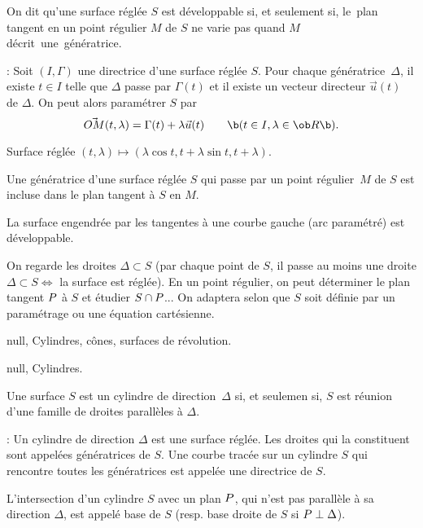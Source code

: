 \Definition [] On dit qu'une surface r\'egl\'ee $S$ est d\'eveloppable si, et seulement si, 
le~plan tangent en un point r\'egulier $M$ de $S$ ne varie pas quand $M$ 
d\'ecrit~une~g\'en\'eratrice. 
\bigskip

\Remarque : Soit $(I,\Gamma)$ une directrice d'une surface r\'egl\'ee $S$. 
Pour chaque g\'en\'eratrice~$\Delta$, il existe $t\in I$ telle que $\Delta$ 
passe par $\Gamma(t)$ et il existe un vecteur directeur $\vec u(t)$ de $\Delta$. 
On peut alors param\'etrer $S$ par 
$$
\vec{OM}(t,\lambda)=\Gamma(t)+\lambda\vec u(t)\qquad\b(t\in I,\lambda\in\ob R\b).
$$ 
\centerline{%
}%
\Figure [Index=Surfaces!Intersection]  Surface r\'egl\'ee $(t,\lambda)\mapsto( \lambda\cos t,t+\lambda\sin t,
t+\lambda)$.

\Propriete [] Une g\'en\'eratrice d'une surface r\'egl\'ee $S$ qui passe 
par un point r\'egulier~$M$ de $S$ est incluse 
dans le plan tangent \`a $S$ en $M$. 
\bigskip

\Theoreme [] La surface engendr\'ee par les tangentes \`a une courbe gauche (arc param\'etr\'e) 
est d\'eveloppable. 
\bigskip

On regarde les droites $\Delta\subset S$ \pn(par chaque point de $S$, 
il passe au moins une droite 
$\Delta\subset S\Leftrightarrow$ la surface est r\'egl\'ee). \medskip\noindent 
En un point r\'egulier, on peut d\'eterminer le plan tangent $\sc P$ \`a $S$ 
et \'etudier $S\cap \sc P$... \medskip\pn
On adaptera selon que $S$ soit d\'efinie par un param\'etrage ou une \'equation cart\'esienne. 
\bigskip

\Section null, Cylindres, c\^ones, surfaces de r\'evolution.

\Subsection null, Cylindres.

Une surface $S$ est un cylindre de direction~$\Delta$ si, et seulemen si, $S$ 
est r\'eunion d'une famille de droites parall\`eles \`a $\Delta$.  
\bigskip

\Remarque : Un cylindre de direction $\Delta$ est une surface r\'egl\'ee. \pn 
Les droites qui la constituent sont appel\'ees g\'en\'eratrices de $S$. \pn
Une courbe trac\'ee sur un cylindre $S$ qui rencontre toutes les g\'en\'eratrices est appel\'ee 
une directrice de $S$. 
\bigskip

\Definition [] L'intersection d'un cylindre $S$ avec un plan $\sc P$, qui n'est pas parall\`ele 
\`a sa direction $\Delta$, est appel\'e base de $S$ 
(resp. base droite de $S$ si $\sc P\perp\Delta$). 


